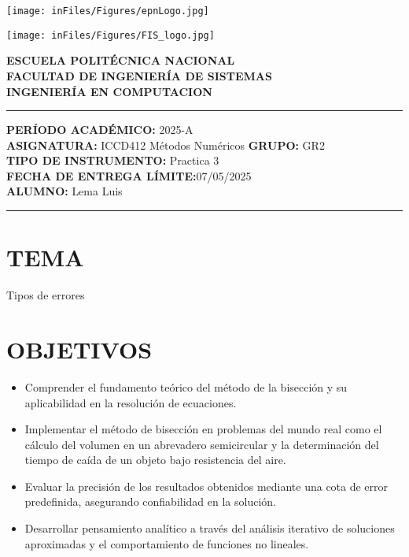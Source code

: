 \documentclass[12pt]{article}
\begin{document}
\begin{minipage}{0.45\textwidth}
    \texttt{[image: inFiles/Figures/epnLogo.jpg]}
\end{minipage}
\hfill
\begin{minipage}{0.45\textwidth}
    \raggedleft
    \texttt{[image: inFiles/Figures/FIS\_logo.jpg]}
\end{minipage}

\vspace{0.5cm}

\begin{center}
    \textbf{ESCUELA POLITÉCNICA NACIONAL}\\[0.2cm]
    \textbf{FACULTAD DE INGENIERÍA DE SISTEMAS}\\[0.2cm]
    \textbf{INGENIERÍA {\textbf{EN COMPUTACION}}}
\end{center}

\vspace{0.5cm}
\hrule
\vspace{0.5cm}

\noindent\textbf{PERÍODO ACADÉMICO:} 2025-A\\[0.2cm]
\noindent\textbf{ASIGNATURA:} ICCD412 Métodos Numéricos \hfill \textbf{GRUPO:} GR2\\[0.2cm]
\noindent\textbf{TIPO DE INSTRUMENTO:} {Practica 3}\\[0.2cm]
\noindent\textbf{FECHA DE ENTREGA LÍMITE:}{07/05/2025}\\[0.2cm]
\noindent\textbf{ALUMNO:} {Lema Luis}

\vspace{0.5cm}
\hrule
\vspace{1cm}


\section*{TEMA}
{Tipos de errores}

\vspace{0.5cm}

\section*{OBJETIVOS}
\begin{itemize}
    \item Comprender el fundamento teórico del método de la bisección y su aplicabilidad en la resolución de ecuaciones.
    \item Implementar el método de bisección en problemas del mundo real como el cálculo del volumen en un abrevadero semicircular y la determinación del tiempo de caída de un objeto bajo resistencia del aire.
    \item Evaluar la precisión de los resultados obtenidos mediante una cota de error predefinida, asegurando confiabilidad en la solución.
    \item Desarrollar pensamiento analítico a través del análisis iterativo de soluciones aproximadas y el comportamiento de funciones no lineales.
\end{itemize}
\end{document}

